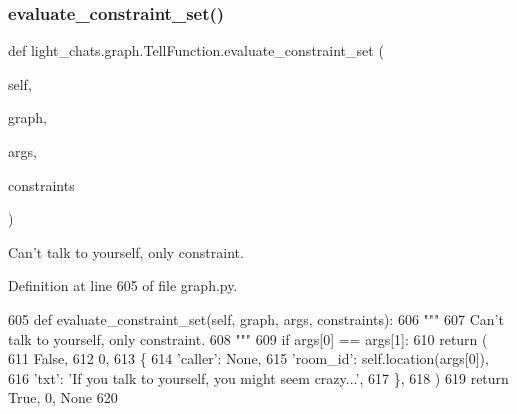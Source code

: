 \subsubsection{\texorpdfstring{evaluate\+\_\+constraint\+\_\+set()}{evaluate\_constraint\_set()}}
{\footnotesize\ttfamily def light\+\_\+chats.\+graph.\+Tell\+Function.\+evaluate\+\_\+constraint\+\_\+set (\begin{DoxyParamCaption}\item[{}]{self,  }\item[{}]{graph,  }\item[{}]{args,  }\item[{}]{constraints }\end{DoxyParamCaption})}

\begin{DoxyVerb}Can't talk to yourself, only constraint.
\end{DoxyVerb}
 

Definition at line 605 of file graph.\+py.


\begin{DoxyCode}
605     \textcolor{keyword}{def }evaluate\_constraint\_set(self, graph, args, constraints):
606         \textcolor{stringliteral}{"""}
607 \textcolor{stringliteral}{        Can't talk to yourself, only constraint.}
608 \textcolor{stringliteral}{        """}
609         \textcolor{keywordflow}{if} args[0] == args[1]:
610             \textcolor{keywordflow}{return} (
611                 \textcolor{keyword}{False},
612                 0,
613                 \{
614                     \textcolor{stringliteral}{'caller'}: \textcolor{keywordtype}{None},
615                     \textcolor{stringliteral}{'room\_id'}: self.location(args[0]),
616                     \textcolor{stringliteral}{'txt'}: \textcolor{stringliteral}{'If you talk to yourself, you might seem crazy...'},
617                 \},
618             )
619         \textcolor{keywordflow}{return} \textcolor{keyword}{True}, 0, \textcolor{keywordtype}{None}
620 
\end{DoxyCode}
\mbox{\label{classlight__chats_1_1graph_1_1TellFunction_ab4c8496d4fa9e03040b6090eaa65528a}} 

